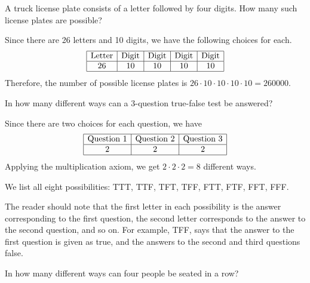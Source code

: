 \begin{example}
    A truck license plate consists of a letter followed by four digits. How many such license plates are possible?
\end{example}

\begin{solution}
    Since there are 26 letters and 10 digits, we have the following choices for each.
    \[
        \begin{array}{|c|c|c|c|c|}
            \hline
            \text{Letter} & \text{Digit} & \text{Digit} & \text{Digit} & \text{Digit} \\
            \hline
            26            & 10           & 10           & 10           & 10           \\
            \hline
        \end{array}
    \]
    Therefore, the number of possible license plates is \( 26 \cdot 10 \cdot 10 \cdot 10 \cdot 10 = 260000 \).
\end{solution}

\begin{example}
    In how many different ways can a 3-question true-false test be answered?
\end{example}

\begin{solution}
    Since there are two choices for each question, we have
    \[
        \begin{array}{|c|c|c|}
            \hline
            \text{Question 1} & \text{Question 2} & \text{Question 3} \\
            \hline
            2                 & 2                 & 2                 \\
            \hline
        \end{array}
    \]
    Applying the multiplication axiom, we get \( 2 \cdot 2 \cdot 2 = 8 \) different ways.

    We list all eight possibilities: TTT, TTF, TFT, TFF, FTT, FTF, FFT, FFF.

    The reader should note that the first letter in each possibility is the answer corresponding to the first question, the second letter corresponds to the answer to the second question, and so on. For example, TFF, says that the answer to the first question is given as true, and the answers to the second and third questions false.
\end{solution}

\begin{example}
    In how many different ways can four people be seated in a row?
\end{example}

